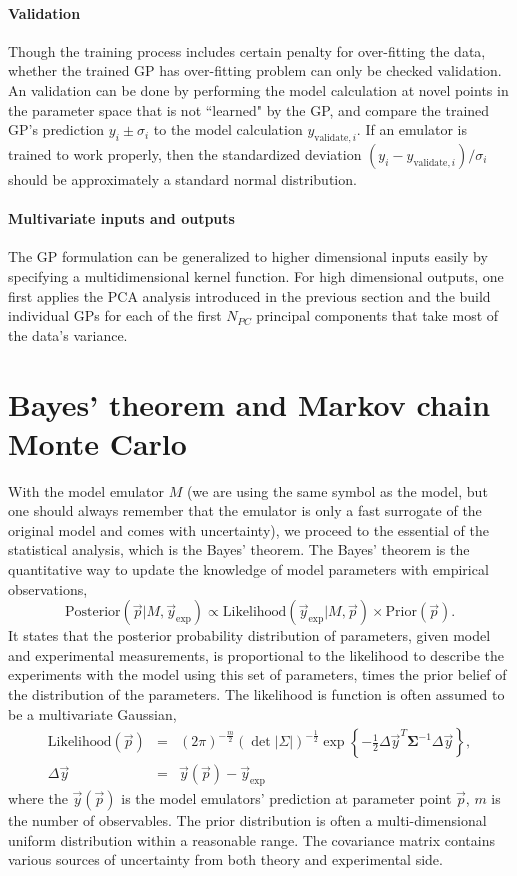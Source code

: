 \paragraph{Validation} Though the training process includes certain penalty for over-fitting the data, whether the trained GP has over-fitting problem can only be checked validation.
An validation can be done by performing the model calculation at novel points in the parameter space that is not ``learned" by the GP, and compare the trained GP's prediction $y_i \pm \sigma_i$ to the model calculation $y_{\textrm{validate}, i}$.
If an emulator is trained to work properly, then the standardized deviation $(y_i - y_{\textrm{validate}, i})/\sigma_i$ should be approximately a standard normal distribution.

\paragraph{Multivariate inputs and outputs} The GP formulation can be generalized to higher dimensional inputs easily by specifying a multidimensional kernel function.
For high dimensional outputs, one first applies the PCA analysis introduced in the previous section and the build individual GPs for each of the first $N_{PC}$ principal components that take most of the data's variance.

\section{Bayes' theorem and Markov chain Monte Carlo}
With the model emulator $M$ (we are using the same symbol as the model, but one should always remember that the emulator is only a fast surrogate of the original model and comes with uncertainty), we proceed to the essential of the statistical analysis, which is the Bayes' theorem.
The Bayes' theorem is the quantitative way to update the knowledge of model parameters with empirical observations,
\begin{equation}
\mathrm{Posterior}(\vec{p}|M, \vec{y}_{\textrm{exp}}) \propto \mathrm{Likelihood}(\vec{y}_{\textrm{exp}}|M, \vec{p})\times\mathrm{Prior}(\vec{p}).
\end{equation}
It states that the posterior probability distribution of parameters, given model and experimental measurements, is proportional to the likelihood to describe the experiments with the model using this set of parameters, times the prior belief of the distribution of the parameters.
The likelihood is function is often assumed to be a multivariate Gaussian,
\begin{eqnarray}
\mathrm{Likelihood}(\vec{p}) &=& (2\pi)^{-\frac{m}{2}} (\det|\Sigma|)^{-\frac{1}{2}} \exp\left\{-\frac{1}{2}\Delta \vec{y}^T \mathbf{\Sigma}^{-1} \Delta \vec{y}\right\}, \\ 
\Delta \vec{y} &=& \vec{y}(\vec{p}) - \vec{y}_{\textrm{exp}}
\end{eqnarray}
where the $\vec{y}(\vec{p})$ is the model emulators' prediction at parameter point $\vec{p}$, $m$ is the number of observables.
The prior distribution is often a multi-dimensional uniform distribution within a reasonable range. 
The covariance matrix contains various sources of uncertainty from both theory and experimental side.


